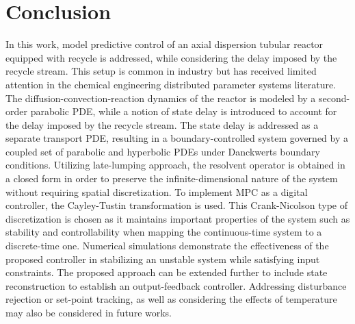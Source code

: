 \section{Conclusion}

In this work, model predictive control of an axial dispersion tubular reactor equipped with recycle is addressed, while considering the delay imposed by the recycle stream. This setup is common in industry but has received limited attention in the chemical engineering distributed parameter systems literature. The diffusion-convection-reaction dynamics of the reactor is modeled by a second-order parabolic PDE, while a notion of state delay is introduced to account for the delay imposed by the recycle stream. The state delay is addressed as a separate transport PDE, resulting in a boundary-controlled system governed by a coupled set of parabolic and hyperbolic PDEs under Danckwerts boundary conditions. Utilizing late-lumping approach, the resolvent operator is obtained in a closed form in order to preserve the infinite-dimensional nature of the system without requiring spatial discretization. To implement MPC as a digital controller, the Cayley-Tustin transformation is used. This Crank-Nicolson type of discretization is chosen as it maintains important properties of the system such as stability and controllability when mapping the continuous-time system to a discrete-time one. Numerical simulations demonstrate the effectiveness of the proposed controller in stabilizing an unstable system while satisfying input constraints. The proposed approach can be extended further to include state reconstruction to establish an output-feedback controller. Addressing disturbance rejection or set-point tracking, as well as considering the effects of temperature may also be considered in future works.